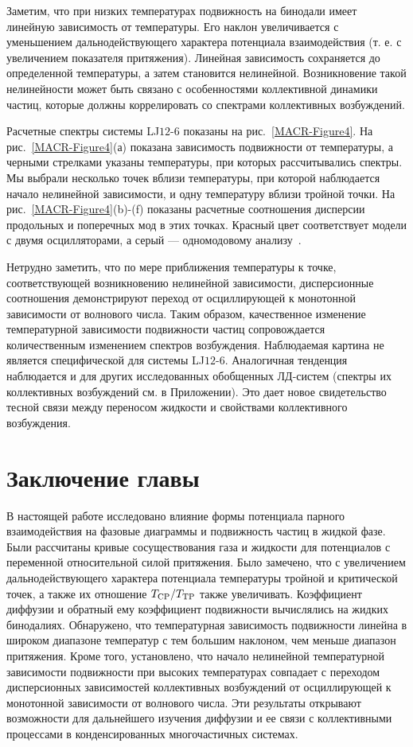 Заметим, что при низких температурах подвижность на бинодали имеет линейную зависимость от температуры. Его наклон увеличивается с уменьшением дальнодействующего характера потенциала взаимодействия (т. е. с увеличением показателя притяжения). Линейная зависимость сохраняется до определенной температуры, а затем становится нелинейной. Возникновение такой нелинейности может быть связано с особенностями коллективной динамики частиц, которые должны коррелировать со спектрами коллективных возбуждений.

Расчетные спектры системы LJ$12$-$6$ показаны на рис.~\ref{MACR-Figure4}. На рис.~\ref{MACR-Figure4}(а) показана зависимость подвижности от температуры, а черными стрелками указаны температуры, при которых рассчитывались спектры. Мы выбрали несколько точек вблизи температуры, при которой наблюдается начало нелинейной зависимости, и одну температуру вблизи тройной точки. На рис.~\ref{MACR-Figure4}(b)-(f) показаны расчетные соотношения дисперсии продольных и поперечных мод в этих точках. Красный цвет соответствует модели с двумя осцилляторами, а серый — одномодовому анализу~\cite{10.1038/s41598-019-46979-y}.

Нетрудно заметить, что по мере приближения температуры к точке, соответствующей возникновению нелинейной зависимости, дисперсионные соотношения демонстрируют переход от осциллирующей к монотонной зависимости от волнового числа. Таким образом, качественное изменение температурной зависимости подвижности частиц сопровождается количественным изменением спектров возбуждения. Наблюдаемая картина не является специфической для системы LJ$12$-$6$. Аналогичная тенденция наблюдается и для других исследованных обобщенных ЛД-систем (спектры их коллективных возбуждений см. в Приложении). Это дает новое свидетельство тесной связи между переносом жидкости и свойствами коллективного возбуждения.

\section{Заключение главы}
\label{MACR-SecConclusions}

В настоящей работе исследовано влияние формы потенциала парного взаимодействия на фазовые диаграммы и подвижность частиц в жидкой фазе. Были рассчитаны кривые сосуществования газа и жидкости для потенциалов с переменной относительной силой притяжения. Было замечено, что с увеличением дальнодействующего характера потенциала температуры тройной и критической точек, а также их отношение $T_{\rm CP}/T_{\rm TP}$ также увеличивать. Коэффициент диффузии и обратный ему коэффициент подвижности вычислялись на жидких бинодалиях. Обнаружено, что температурная зависимость подвижности линейна в широком диапазоне температур с тем большим наклоном, чем меньше диапазон притяжения. Кроме того, установлено, что начало нелинейной температурной зависимости подвижности при высоких температурах совпадает с переходом дисперсионных зависимостей коллективных возбуждений от осциллирующей к монотонной зависимости от волнового числа. Эти результаты открывают возможности для дальнейшего изучения диффузии и ее связи с коллективными процессами в конденсированных многочастичных системах.


